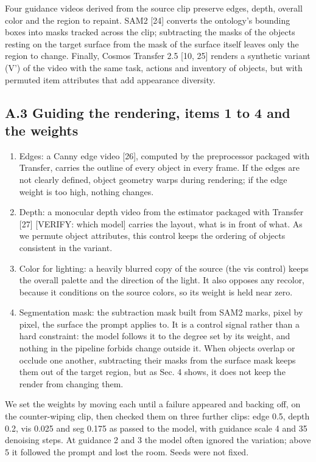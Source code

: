 \documentclass[
  11pt,
]{article}
\providecommand{\tightlist}{%
  \setlength{\itemsep}{0pt}\setlength{\parskip}{0pt}}
\begin{document}
Four guidance videos derived from the source clip preserve edges, depth,
overall color and the region to repaint. SAM2 {[}24{]} converts the
ontology's bounding boxes into masks tracked across the clip;
subtracting the masks of the objects resting on the target surface from
the mask of the surface itself leaves only the region to change.
Finally, Cosmos Transfer 2.5 {[}10, 25{]} renders a synthetic variant
(V') of the video with the same task, actions and inventory of objects,
but with permuted item attributes that add appearance diversity.

\subsection{A.3 Guiding the rendering, items 1 to 4 and the
weights}\label{a.3-guiding-the-rendering-items-1-to-4-and-the-weights}

\begin{enumerate}
\def\labelenumi{\arabic{enumi}.}
\tightlist
\item
  Edges: a Canny edge video {[}26{]}, computed by the preprocessor
  packaged with Transfer, carries the outline of every object in every
  frame. If the edges are not clearly defined, object geometry warps
  during rendering; if the edge weight is too high, nothing changes.
\item
  Depth: a monocular depth video from the estimator packaged with
  Transfer {[}27{]} {[}VERIFY: which model{]} carries the layout, what
  is in front of what. As we permute object attributes, this control
  keeps the ordering of objects consistent in the variant.
\item
  Color for lighting: a heavily blurred copy of the source (the vis
  control) keeps the overall palette and the direction of the light. It
  also opposes any recolor, because it conditions on the source colors,
  so its weight is held near zero.
\item
  Segmentation mask: the subtraction mask built from SAM2 marks, pixel
  by pixel, the surface the prompt applies to. It is a control signal
  rather than a hard constraint: the model follows it to the degree set
  by its weight, and nothing in the pipeline forbids change outside it.
  When objects overlap or occlude one another, subtracting their masks
  from the surface mask keeps them out of the target region, but as Sec.
  4 shows, it does not keep the render from changing them.
\end{enumerate}

We set the weights by moving each until a failure appeared and backing
off, on the counter-wiping clip, then checked them on three further
clips: edge 0.5, depth 0.2, vis 0.025 and seg 0.175 as passed to the
model, with guidance scale 4 and 35 denoising steps. At guidance 2 and 3
the model often ignored the variation; above 5 it followed the prompt
and lost the room. Seeds were not fixed.
\end{document}
